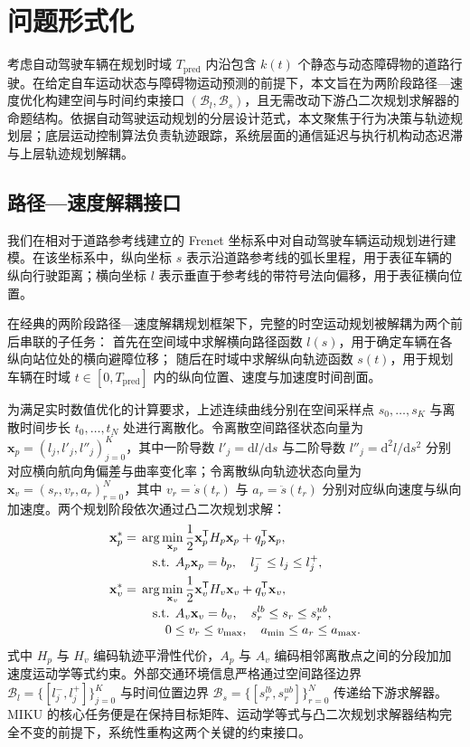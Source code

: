 \section{问题形式化}
\label{zh:sec:problem}

考虑自动驾驶车辆在规划时域 $T_{\mathrm{pred}}$ 内沿包含 $k(t)$ 个静态与动态障碍物的道路行驶。在给定自车运动状态与障碍物运动预测的前提下，本文旨在为两阶段路径—速度优化构建空间与时间约束接口 $(\mathcal{B}_l,\mathcal{B}_s)$，且无需改动下游凸二次规划求解器的命题结构。依据自动驾驶运动规划的分层设计范式，本文聚焦于行为决策与轨迹规划层；底层运动控制算法负责轨迹跟踪，系统层面的通信延迟与执行机构动态迟滞与上层轨迹规划解耦。

\subsection{路径—速度解耦接口}

我们在相对于道路参考线建立的 Frenet 坐标系中对自动驾驶车辆运动规划进行建模。在该坐标系中，纵向坐标 $s$ 表示沿道路参考线的弧长里程，用于表征车辆的纵向行驶距离；横向坐标 $l$ 表示垂直于参考线的带符号法向偏移，用于表征横向位置。

在经典的两阶段路径—速度解耦规划框架下，完整的时空运动规划被解耦为两个前后串联的子任务：
首先在空间域中求解横向路径函数 $l(s)$，用于确定车辆在各纵向站位处的横向避障位移；
随后在时域中求解纵向轨迹函数 $s(t)$，用于规划车辆在时域 $t \in [0, T_{\mathrm{pred}}]$ 内的纵向位置、速度与加速度时间剖面。

为满足实时数值优化的计算要求，上述连续曲线分别在空间采样点 $s_0,\dots,s_K$ 与离散时间步长 $t_0,\dots,t_N$ 处进行离散化。令离散空间路径状态向量为 $\mathbf{x}_p=(l_j,l'_j,l''_j)_{j=0}^{K}$，其中一阶导数 $l'_j = \mathrm{d}l/\mathrm{d}s$ 与二阶导数 $l''_j = \mathrm{d}^2l/\mathrm{d}s^2$ 分别对应横向航向角偏差与曲率变化率；令离散纵向轨迹状态向量为 $\mathbf{x}_v=(s_r,v_r,a_r)_{r=0}^{N}$，其中 $v_r = \dot{s}(t_r)$ 与 $a_r = \ddot{s}(t_r)$ 分别对应纵向速度与纵向加速度。两个规划阶段依次通过凸二次规划求解：
\begin{align}
 \mathbf{x}_p^*={}&\arg\min_{\mathbf{x}_p}
 \frac{1}{2}\mathbf{x}_p^{\mathsf T}H_p\mathbf{x}_p+q_p^{\mathsf T}\mathbf{x}_p,\\[-2pt]
 &\quad\text{s.t. }A_p\mathbf{x}_p=b_p,\quad l_j^-\leq l_j\leq l_j^+, \label{zh:eq:path_qp}\\
 \mathbf{x}_v^*={}&\arg\min_{\mathbf{x}_v}
 \frac{1}{2}\mathbf{x}_v^{\mathsf T}H_v\mathbf{x}_v+q_v^{\mathsf T}\mathbf{x}_v,\\[-2pt]
 &\quad\text{s.t. }A_v\mathbf{x}_v=b_v,\quad s_r^{lb}\leq s_r\leq s_r^{ub},\notag\\[-2pt]
 &\qquad 0\leq v_r\leq v_{\max},\quad a_{\min}\leq a_r\leq a_{\max}. \label{zh:eq:speed_qp}
\end{align}
式中 $H_p$ 与 $H_v$ 编码轨迹平滑性代价，$A_p$ 与 $A_v$ 编码相邻离散点之间的分段加加速度运动学等式约束。外部交通环境信息严格通过空间路径边界 $\mathcal{B}_l=\{[l_j^-,l_j^+]\}_{j=0}^K$ 与时间位置边界 $\mathcal{B}_s=\{[s_r^{lb},s_r^{ub}]\}_{r=0}^N$ 传递给下游求解器。MIKU 的核心任务便是在保持目标矩阵、运动学等式与凸二次规划求解器结构完全不变的前提下，系统性重构这两个关键的约束接口。

